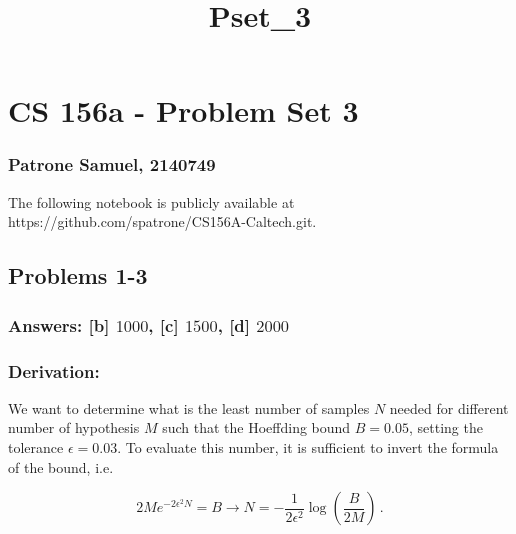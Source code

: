 \documentclass[11pt]{article}
\title{Pset\_3}
\begin{document}
    
    \maketitle
    
    

    
    \hypertarget{cs-156a---problem-set-3}{%
\section{CS 156a - Problem Set 3}\label{cs-156a---problem-set-3}}

\hypertarget{patrone-samuel-2140749}{%
\subsubsection{Patrone Samuel, 2140749}\label{patrone-samuel-2140749}}

The following notebook is publicly available at
https://github.com/spatrone/CS156A-Caltech.git.

    \hypertarget{problems-1-3}{%
\subsection{Problems 1-3}\label{problems-1-3}}

\hypertarget{answers-b-1000-c-1500-d-2000}{%
\subsubsection{\texorpdfstring{Answers: {[}b{]} \(1000\), {[}c{]}
\(1500\), {[}d{]}
\(2000\)}{Answers: {[}b{]} 1000, {[}c{]} 1500, {[}d{]} 2000}}\label{answers-b-1000-c-1500-d-2000}}

\hypertarget{derivation}{%
\subsubsection{Derivation:}\label{derivation}}

We want to determine what is the least number of samples \(N\) needed
for different number of hypothesis \(M\) such that the Hoeffding bound
\(B=0.05\), setting the tolerance \(\epsilon=0.03\). To evaluate this
number, it is sufficient to invert the formula of the bound, i.e.

\[
2 M e^{-2\epsilon^2 N} = B \rightarrow N=-\frac{1}{2\epsilon^2}\log\left(\frac{B}{2 M}\right)\,.
\]
\end{document}
